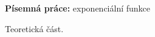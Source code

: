 \documentclass[12pt,a4paper]{exam}
\begin{document}
    \begin{center}
    \large \textbf{Písemná práce:} exponenciální funkce

    \normalsize
    \qquad
    \qquad

    \end{center}

    \noindent
    \pagestyle{empty}
    \begin{questions}
        \bracketedpoints
        \question[2] Teoretická část.
\end{questions}
\end{document}
